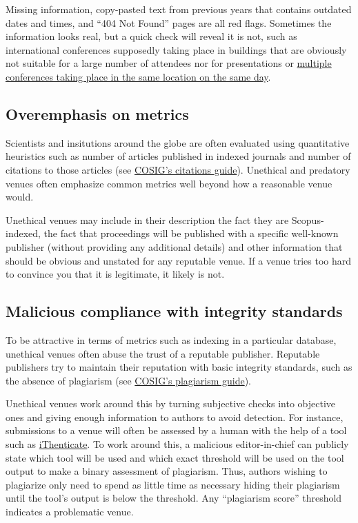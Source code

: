 \documentclass[letterpaper, 12pt]{article}
\begin{document}
Missing information, copy-pasted text from previous years that contains outdated dates and times,
and ``404 Not Found'' pages are all red flags.
Sometimes the information looks real, but a quick check will reveal it is not,
such as international conferences supposedly taking place in buildings that are
obviously not suitable for a large number of attendees nor for presentations or \href{https://doi.org/10.1038/d41586-024-02358-w}{multiple conferences taking place in the same location on the same day}.

\subsection*{Overemphasis on metrics}

Scientists and insitutions around the globe are often evaluated using quantitative heuristics such as number of articles published in indexed journals and number of citations to those articles (see \href{https://osf.io/zpf4r}{COSIG's citations guide}). Unethical and predatory venues often emphasize common metrics well beyond how a reasonable venue would.

Unethical venues may include in their description the fact they are Scopus-indexed,
the fact that proceedings will be published with a specific well-known publisher (without providing any additional details)
and other information that should be obvious and unstated for any reputable venue.
If a venue tries too hard to convince you that it is legitimate, it likely is not.

\subsection*{Malicious compliance with integrity standards}

To be attractive in terms of metrics such as indexing in a particular database,
unethical venues often abuse the trust of a reputable publisher.
Reputable publishers try to maintain their reputation with basic integrity standards, such as the absence of plagiarism (see \href{https://osf.io/ntcb4}{COSIG's plagiarism guide}).

Unethical venues work around this by turning subjective checks into objective ones
and giving enough information to authors to avoid detection.
For instance, submissions to a venue will often be assessed by a human with the help of a tool such as
\href{https://www.ithenticate.com/}{iThenticate}.
To work around this, a malicious editor-in-chief can publicly state which tool will be used
and which exact threshold will be used on the tool output to make a binary assessment of plagiarism.
Thus, authors wishing to plagiarize only need to spend as little time as necessary hiding their plagiarism
until the tool's output is below the threshold.
Any ``plagiarism score'' threshold indicates a problematic venue.
\end{document}
